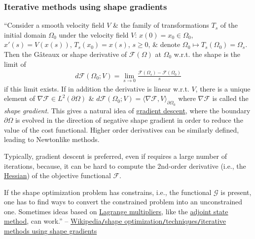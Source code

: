 \documentclass[oneside]{book}
\numberwithin{equation}{section}
\begin{document}
\subsubsection{Iterative methods using shape gradients}
``Consider a smooth velocity field $V$ \& the family of transformations $T_s$ of the initial domain $\Omega_0$ under the velocity field $V$: $x(0) = x_0\in\Omega_0$, $x'(s) = V(x(s))$, $T_s(x_0) = x(s)$, $s\ge 0$, \& denote $\Omega_0\mapsto T_s(\Omega_0) = \Omega_s$. Then the G\^ateaux or shape derivative of $\mathcal{F}(\Omega)$ at $\Omega_0$ w.r.t. the shape is the limit of
\begin{align*}
	d\mathcal{F}(\Omega_0;V) = \lim_{s\to 0} \frac{\mathcal{F}(\Omega_s) - \mathcal{F}(\Omega_0)}{s}
\end{align*}
if this limit exists. If in addition the derivative is linear w.r.t. $V$, there is a unique element of $\nabla\mathcal{F}\in L^2(\partial\Omega)$ \& $d\mathcal{F}(\Omega_0;V) = \langle\nabla\mathcal{F},V\rangle_{\partial\Omega_0}$ where $\nabla\mathcal{F}$ is called the \textit{shape gradient}. This gives a natural idea of \href{https://en.wikipedia.org/wiki/Gradient_descent}{gradient descent}, where the boundary $\partial\Omega$ is evolved in the direction of negative shape gradient in order to reduce the value of the cost functional. Higher order derivatives can be similarly defined, leading to Newtonlike methods.

Typically, gradient descent is preferred, even if requires a large number of iterations, because, it can be hard to compute the 2nd-order derivative (i.e., the \href{https://en.wikipedia.org/wiki/Hessian_matrix}{Hessian}) of the objective functional $\mathcal{F}$.

If the shape optimization problem has constrains, i.e., the functional $\mathcal{G}$ is present, one has to find ways to convert the constrained problem into an unconstrained one. Sometimes ideas based on \href{https://en.wikipedia.org/wiki/Lagrange_multipliers}{Lagrange multipliers}, like the \href{https://en.wikipedia.org/wiki/Adjoint_state_method}{adjoint state method}, can work.'' -- \href{https://en.wikipedia.org/wiki/Shape_optimization#Iterative_methods_using_shape_gradients}{Wikipedia\texttt{/}shape optimization\texttt{/}techniques\texttt{/}iterative methods using shape gradients}
\end{document}
